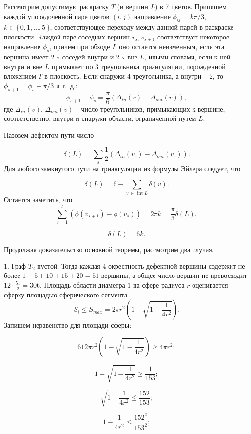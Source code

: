 \begin{myproof}
\begin{myproof}

Рассмотрим допустимую раскраску $T$ (и вершин $L$) в 7 цветов. 
Припишем каждой упорядоченной паре цветов $(i,j)$ направление 
$\phi_{ij}=k\pi/3$, $k \in \{ \, 0, 1, \dots , 5 \, \}$, соответствующее переходу между данной парой в раскраске плоскости. 
Каждой паре соседних вершин $v_s, v_{s+1}$ соответствует некоторое направление $\phi_s$, 
причем при обходе $L$ оно остается неизменным, если эта вершина имеет $2$-x соседей внутри и $2$-x вне $L$, 
иными словами, если к ней внутри и вне $L$ примыкает по $3$ треугольника триангуляции, порожденной вложением $T$ в плоскость. 
Если снаружи $4$ треугольника, а внутри -- $2$, то  $\phi_{s+1}=\phi_s-\pi/3$ и т.~д.:
$$\phi_{s+1}-\phi_{s} = \frac{\pi}{6} \left( \Delta_{in}(v)- \Delta_{out}(v) \right),$$
где $\Delta_{in}(v)$, $\Delta_{out}(v)$ -- число треугольников, примыкающих к вершине, 
соответственно, внутри и снаружи области, ограниченной путем $L$. 

Назовем дефектом пути число

$$\delta(L) = \sum\limits_{s} \frac{1}{2} \left(\Delta_{in}(v_s) - \Delta_{out}(v_s) \right).$$
Для любого замкнутого пути на триангуляции из формулы Эйлера следует, что 

$$\delta(L) = 6 - \sum\limits_{v \, \in \, \operatorname{int} L} \delta(v).$$
Остается заметить, что $$\sum\limits_{s=1}^l \left(\phi(v_{s+1}) - \phi(v_s)\right) = 2\pi k = \frac{\pi}{3} \delta(L),$$ 

$$\delta(L)=6k.$$

\end{myproof}

Продолжая доказательство основной теоремы, рассмотрим два случая.

1. Граф $T_2$ пустой. Тогда каждая $4$-окрестность дефектной вершины содержит не более $1+5+10+15+20=51$ вершины, 
а общее число вершин не превосходит $12 \cdot \frac{51}{2} = 306$. 
Площадь области диаметра $1$ на сфере радиуса $r$ оценивается сферху площадью сферического сегмента
$$S_i \leq S_{max} = 2 \pi r^2 \left(1- \sqrt{1-\frac{1}{4r^2}}\right).$$
Запишем неравенство для площади сферы:

$$ 612 \pi r^2 \left(1- \sqrt{1-\frac{1}{4r^2}}\right) \geq 4 \pi r^2; $$

$$ 1- \sqrt{1-\frac{1}{4r^2}} \geq \frac{1}{153}; $$

$$ \sqrt{1-\frac{1}{4r^2}} \leq \frac{152}{153}; $$

$$ 1-\frac{1}{4r^2} \leq \frac{152^2}{153^2}; $$


\end{myproof}
